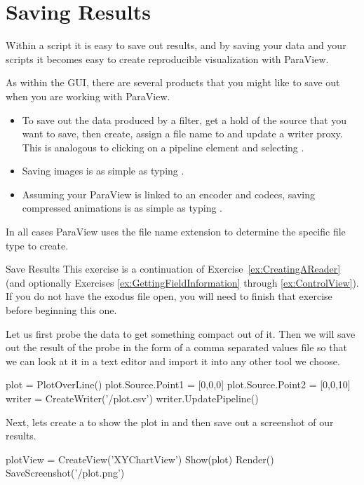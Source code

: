 \section{Saving Results}
\label{sec:Saving}

Within a script it is easy to save out results, and by saving your data and
your scripts it becomes easy to create reproducible visualization with
ParaView.

As within the GUI, there are several products that you might like to save out when you are working with ParaView.
\begin{itemize}
\item To save out the data produced by a filter, get a hold of the source that you want to save, then create, assign a file name to and update a writer proxy.
This is analogous to clicking on a pipeline element and selecting .
\item Saving images is as simple as typing .
\item Assuming your ParaView is linked to an encoder and codecs, saving
compressed animations is as simple as typing
.
\end{itemize}
In all cases ParaView uses the file name extension to determine the specific file type to create.

\begin{exercise}{Save Results}
  \label{ex:SaveResults}%
  This exercise is a continuation of Exercise~\ref{ex:CreatingAReader} (and
  optionally Exercises \ref{ex:GettingFieldInformation} through
  \ref{ex:ControlView}). If you do not have the exodus file open, you will
  need to finish that exercise before beginning this one.

  Let us first probe the data to get something compact out of it. Then we will save out the result of the probe in the form of a comma separated values file so that we can look at it in a text editor and import it into any other tool we choose.

  \begin{pythonpluscommands}
plot = PlotOverLine()
plot.Source.Point1 = [0,0,0]
plot.Source.Point2 = [0,0,10]
writer = CreateWriter('/plot.csv')
writer.UpdatePipeline()
  \end{pythonpluscommands}

  Next, lets create a  to show the plot in and then save out a screenshot of our results.
  \begin{pythonpluscommands}
plotView = CreateView('XYChartView')
Show(plot)
Render()
SaveScreenshot('/plot.png')
  \end{pythonpluscommands}
\end{exercise}

